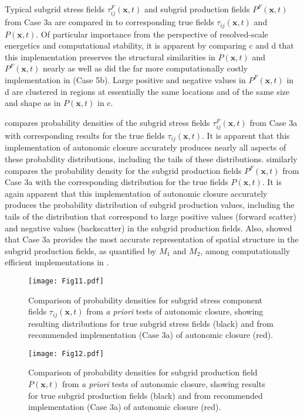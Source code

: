 Typical subgrid stress fields  $\tau_{ij}^{F}(\mathbf{x},t)$ and subgrid production fields $P^{F}(\mathbf{x},t)$  from Case 3a are compared in  to corresponding true fields $\tau_{ij}(\mathbf{x},t)$  and $P(\mathbf{x},t)$. Of particular importance from the perspective of resolved-scale energetics and computational stability, it is apparent by comparing c and d that this implementation preserves the structural similarities in  $P(\mathbf{x},t)$ and $P^{F}(\mathbf{x},t)$  nearly as well as did the far more computationally costly implementation in  (Case 5b). Large positive and negative values in $P^{F}(\mathbf{x},t)$ in d are clustered in regions at essentially the same locations and of the same size and shape as in $P(\mathbf{x},t)$  in c. 

 compares probability densities of the subgrid stress fields $\tau_{ij}^{F}(\mathbf{x},t)$  from Case 3a with corresponding results for the true fields $\tau_{ij}(\mathbf{x},t)$. It is apparent that this implementation of autonomic closure accurately produces nearly all aspects of these probability distributions, including the tails of these distributions.  similarly compares the probability density for the subgrid production fields $P^{F}(\mathbf{x},t)$  from Case 3a with the corresponding distribution for the true fields $P(\mathbf{x},t)$. It is again apparent that this implementation of autonomic closure accurately produces the probability distribution of subgrid production values, including the tails of the distribution that correspond to large positive values (forward scatter) and negative values (backscatter) in the subgrid production fields. Also,  showed that Case 3a provides the most accurate representation of spatial structure in the subgrid production fields, as quantified by  $M_1$ and $M_2$, among computationally efficient implementations in . 

%
\begin{figure}
	\begin{center}
	\texttt{[image: Fig11.pdf]}
	\caption{Comparison of probability densities for subgrid stress component fields $\tau_{ij}(\mathbf{x},t)$ from \textit{a priori} tests of autonomic closure, showing resulting distributions for true subgrid stress fields (black) and from recommended implementation (Case 3a) of autonomic closure (red).}
	\label{F:11}
	\end{center}
\end{figure}
%
%
%
\begin{figure}
	\begin{center}
	\texttt{[image: Fig12.pdf]}
	\caption{Comparison of probability densities for subgrid production field $P(\mathbf{x},t)$ from \textit{a priori} tests of autonomic closure, showing results for true subgrid production fields (black) and from recommended implementation (Case 3a) of autonomic closure (red).}
	\label{F:12}
	\end{center}
\end{figure}
%
%


